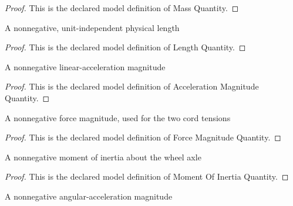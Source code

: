 \begin{proof}
  This is the declared model definition of Mass Quantity.
\end{proof}
\begin{definition}
  \label{def:physics:phyx-mini-0783:phyxminiproblems-problemphyxmini0783-lengthquantity}
  A nonnegative, unit-independent physical length
\end{definition}
\begin{proof}
  This is the declared model definition of Length Quantity.
\end{proof}
\begin{definition}
  \label{def:physics:phyx-mini-0783:phyxminiproblems-problemphyxmini0783-accelerationmagnitudequantity}
  A nonnegative linear-acceleration magnitude
\end{definition}
\begin{proof}
  This is the declared model definition of Acceleration Magnitude Quantity.
\end{proof}
\begin{definition}
  \label{def:physics:phyx-mini-0783:phyxminiproblems-problemphyxmini0783-forcemagnitudequantity}
  A nonnegative force magnitude, used for the two cord tensions
\end{definition}
\begin{proof}
  This is the declared model definition of Force Magnitude Quantity.
\end{proof}
\begin{definition}
  \label{def:physics:phyx-mini-0783:phyxminiproblems-problemphyxmini0783-momentofinertiaquantity}
  A nonnegative moment of inertia about the wheel axle
\end{definition}
\begin{proof}
  This is the declared model definition of Moment Of Inertia Quantity.
\end{proof}
\begin{definition}
  \label{def:physics:phyx-mini-0783:phyxminiproblems-problemphyxmini0783-angularaccelerationmagnitudequantity}
  A nonnegative angular-acceleration magnitude
\end{definition}

